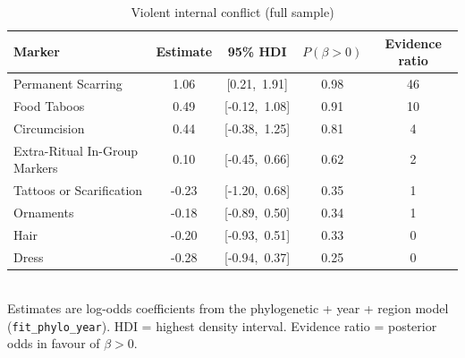 \begin{table}[ht]
\centering
\caption{Violent internal conflict (full sample)}
\begin{tabular}{lcccc}
\toprule
Marker & Estimate & 95\% HDI & $P(\beta > 0)$ & Evidence ratio \\
\midrule
Permanent Scarring & 1.06 & [0.21,\ 1.91] & 0.98 & 46 \\
Food Taboos & 0.49 & [-0.12,\ 1.08] & 0.91 & 10 \\
Circumcision & 0.44 & [-0.38,\ 1.25] & 0.81 & 4 \\
Extra-Ritual In-Group Markers & 0.10 & [-0.45,\ 0.66] & 0.62 & 2 \\
Tattoos or Scarification & -0.23 & [-1.20,\ 0.68] & 0.35 & 1 \\
Ornaments & -0.18 & [-0.89,\ 0.50] & 0.34 & 1 \\
Hair & -0.20 & [-0.93,\ 0.51] & 0.33 & 0 \\
Dress & -0.28 & [-0.94,\ 0.37] & 0.25 & 0 \\
\bottomrule
\end{tabular}
\\[4pt]\small Estimates are log-odds coefficients from the phylogenetic + year + region model (\texttt{fit\_phylo\_year}). HDI = highest density interval. Evidence ratio = posterior odds in favour of $\beta > 0$.
\end{table}